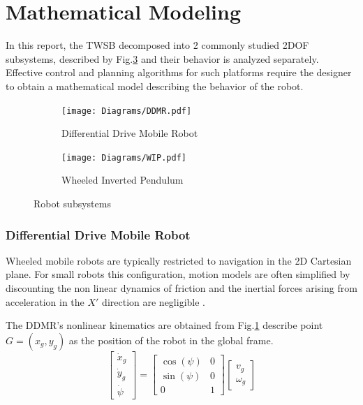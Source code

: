     \section{Mathematical Modeling} %
    In this report, the TWSB decomposed into 2 commonly studied 2DOF subsystems, described by Fig.\ref{fig:2DOF} and their behavior is analyzed
    separately.
    Effective control and planning algorithms for such platforms require the designer to obtain a mathematical model describing the behavior
    of the robot.  
    \begin{figure}[h]
        \centering
        \begin{subfigure}[b]{0.4\textwidth}
            \texttt{[image: Diagrams/DDMR.pdf]}
            \caption{Differential Drive Mobile Robot}
            \label{fig:DDMR}
        \end{subfigure}
        \hfill
        \begin{subfigure}[b]{0.4\textwidth}
            \texttt{[image: Diagrams/WIP.pdf]}
            \caption{Wheeled Inverted Pendulum}
            \label{fig:WIP}
        \end{subfigure}        
        \caption{Robot subsystems}
        \label{fig:2DOF}
    \end{figure}


    \subsubsection{Differential Drive Mobile Robot}
    Wheeled mobile robots are typically restricted to navigation in the 2D Cartesian plane. For small robots 
    this configuration, motion models are often simplified by discounting the non linear dynamics of friction and 
    the inertial forces arising from acceleration in the $X'$ direction are negligible \cite{KinematicWheeled}. 

    The DDMR's nonlinear kinematics are obtained from Fig.\ref{fig:DDMR} describe point $G=(x_g,y_g)$ as the position of 
    the robot in the global frame.
    \begin{equation}
        \begin{bmatrix}
            \dot x_g \\
            \dot y_g \\
            \dot \psi
        \end{bmatrix}
        =
        \begin{bmatrix}
            \cos(\psi) & 0 \\
            \sin(\psi) & 0 \\
            0 & 1
        \end{bmatrix}
        \begin{bmatrix}
            v_g \\
            \omega_g
        \end{bmatrix}
        \label{eq:DDMRGlobal}
    \end{equation}

